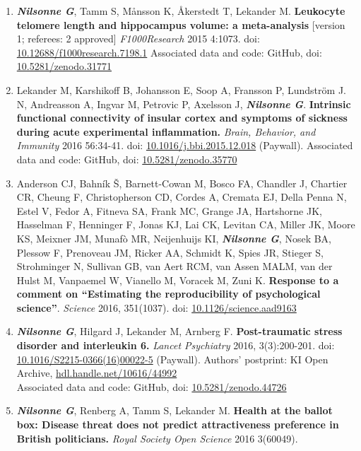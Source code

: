 \documentclass[10pt]{article}
\begin{document}
\begin{enumerate}[nolistsep]
Associated data: \href{https://osf.io/ezcuj}{osf.io/ezcuj}
\item \textbf{\textit{Nilsonne G}}, Tamm S, Månsson K, Åkerstedt T, Lekander M. \textbf{Leukocyte telomere length and hippocampus volume: a meta-analysis} [version 1; referees: 2 approved] \emph{F1000Research} 2015 4:1073.
doi: \href{http://dx.doi.org/10.12688/f1000research.7198.1}{10.12688/f1000research.7198.1}
Associated data and code: GitHub, doi: \href{http://dx.doi.org/10.5281/zenodo.31771}{10.5281/zenodo.31771}
\item Lekander M, Karshikoff B, Johansson E, Soop A, Fransson P, Lundström J. N, Andreasson A, Ingvar M, Petrovic P, Axelsson J, \textbf{\textit{Nilsonne G}}. \textbf{Intrinsic functional connectivity of insular cortex and symptoms of sickness during acute experimental inflammation.} \textit{Brain, Behavior, and Immunity} 2016 56:34-41.
doi: \href{http://dx.doi.org/10.1016/j.bbi.2015.12.018}{10.1016/j.bbi.2015.12.018} (Paywall).
Associated data and code: GitHub, doi: \href{http://dx.doi.org/10.5281/zenodo.35770}{10.5281/zenodo.35770}
\item Anderson CJ, Bahník Š, Barnett-Cowan M, Bosco FA, Chandler J, Chartier CR, Cheung F, Christopherson CD, Cordes A, Cremata EJ, Della Penna N, Estel V, Fedor A, Fitneva SA, Frank MC, Grange JA, Hartshorne JK, Hasselman F, Henninger F, Jonas KJ, Lai CK, Levitan CA, Miller JK, Moore KS, Meixner JM, Munafò MR, Neijenhuijs KI, \textbf{\textit{Nilsonne G}}, Nosek BA, Plessow F, Prenoveau JM, Ricker AA, Schmidt K, Spies JR, Stieger S, Strohminger N, Sullivan GB, van Aert RCM, van Assen MALM, van der Hulst M, Vanpaemel W, Vianello M, Voracek M, Zuni K. \textbf{Response to a comment on “Estimating the reproducibility of psychological science”}. \emph{Science} 2016, 351(1037).
doi: \href{http://dx.doi.org/10.1126/science.aad9163}{10.1126/science.aad9163}
\item \textbf{\textit{Nilsonne G}}, Hilgard J, Lekander M, Arnberg F. \textbf{Post-traumatic stress disorder and interleukin 6.} \emph{Lancet Psychiatry} 2016, 3(3):200-201.
doi: \href{http://dx.doi.org/10.1016/S2215-0366(16)00022-5}{10.1016/S2215-0366(16)00022-5} (Paywall).
Authors' postprint: KI Open Archive, \href{http://hdl.handle.net/10616/44992}{hdl.handle.net/10616/44992}\\
Associated data and code: GitHub, doi: \href{http://dx.doi.org/10.5281/zenodo.44726}{10.5281/zenodo.44726}
\item \textbf{\textit{Nilsonne G}}, Renberg A, Tamm S, Lekander M. \textbf{Health at the ballot box: Disease threat does not predict attractiveness preference in British politicians.} \emph{Royal Society Open Science} 2016 3(60049).

\end{enumerate}
\end{document}

